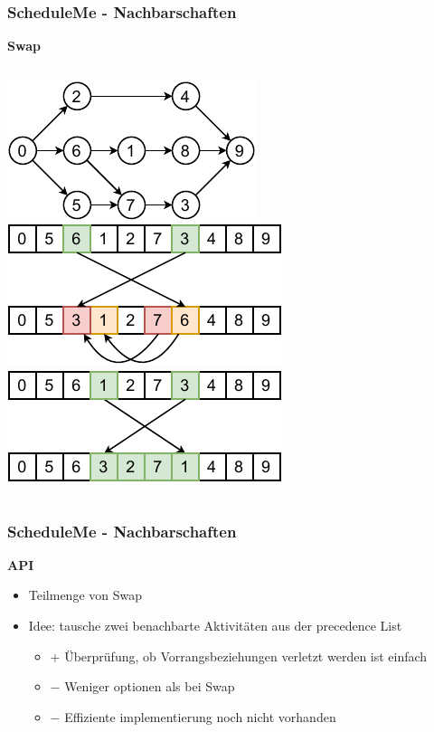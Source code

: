 \documentclass[aspectratio=169]{beamer}
\begin{document}
\begin{frame}
\frametitle{ScheduleMe - Nachbarschaften}
\textbf{Swap}
\begin{columns}[c] %
	\includegraphics[scale=1.3]{../images/tree.pdf}	
	\includegraphics[scale=1.2]{../images/swap0.pdf}
	\includegraphics[scale=1.2]{../images/swap1.pdf}	
\end{columns}
\end{frame}


\begin{frame}
\frametitle{ScheduleMe - Nachbarschaften}
\textbf{API}
\begin{itemize}
	\item Teilmenge von Swap
	\item Idee: tausche zwei benachbarte Aktivitäten aus der precedence List
	\begin{itemize}
		\item $+$ Überprüfung, ob Vorrangsbeziehungen verletzt werden ist einfach
		\item $-$  Weniger optionen als bei Swap
		\item $-$  Effiziente implementierung noch nicht vorhanden
	\end{itemize}
\end{itemize}
\end{frame}
\end{document}
